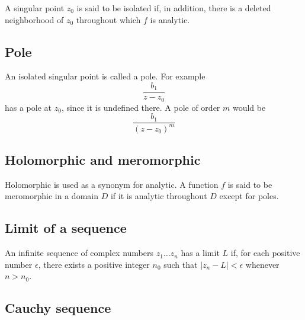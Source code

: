 \documentclass[11pt, oneside]{article}
\begin{document}
A singular point $z_0$  is said to be isolated if, in addition, there is a deleted neighborhood  of $z_0$  throughout which $f$ is analytic.

\subsection*{Pole}
An isolated singular point is called a pole.  For example
\[ \frac{b_1}{z - z_0} \]
has a pole at $z_0$, since it is undefined there.  A pole of order $m$ would be
\[ \frac{b_1}{(z - z_0)^m} \]

\subsection*{Holomorphic and meromorphic}
Holomorphic is used as a synonym for analytic.  A function $f$ is said to be meromorphic in a domain $D$ if it is analytic throughout $D$ except for poles.

\subsection*{Limit of a sequence}
An infinite sequence of complex numbers $z_1 \dots z_n$ has a limit $L$ if, for each positive number $\epsilon$, there exists a positive integer $n_0$ such that $|z_n - L| < \epsilon$ whenever $n>n_0$.

\subsection*{Cauchy sequence}
\end{document}
